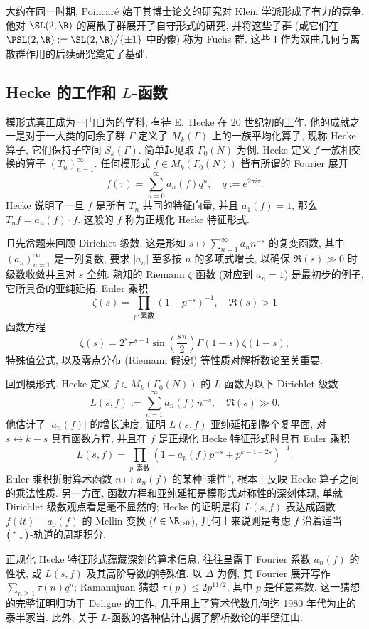 大约在同一时期, Poincaré 始于其博士论文的研究对 Klein 学派形成了有力的竞争. 他对 $\SL(2, \R)$ 的离散子群展开了自守形式的研究, 并将这些子群 (或它们在 $\PSL(2, \R) := \SL(2, \R) \big/ \{\pm 1\}$ 中的像) 称为 Fuchs 群. 这些工作为双曲几何与离散群作用的后续研究奠定了基础.

\subsection*{Hecke 的工作和 $L$-函数}
模形式真正成为一门自为的学科, 有待 E.\ Hecke 在 20 世纪初的工作. 他的成就之一是对于一大类的同余子群 $\Gamma$ 定义了 $M_k(\Gamma)$ 上的一族平均化算子, 现称 Hecke 算子, 它们保持子空间 $S_k(\Gamma)$. 简单起见取 $\Gamma_0(N)$ 为例. Hecke 定义了一族相交换的算子 $(T_n)_{n=1}^\infty$. 任何模形式 $f \in M_k(\Gamma_0(N))$ 皆有所谓的 Fourier 展开
\[ f(\tau) = \sum_{n = 0}^\infty a_n(f) q^n, \quad q := e^{2\pi i\tau}. \]
Hecke 说明了一旦 $f$ 是所有 $T_n$ 共同的特征向量, 并且 $a_1(f) = 1$, 那么 $T_n f = a_n(f) \cdot f$. 这般的 $f$ 称为正规化 Hecke 特征形式.

且先岔题来回顾 Dirichlet 级数. 这是形如 $s \mapsto \sum_{n=1}^\infty a_n n^{-s}$ 的复变函数, 其中 $(a_n)_{n=1}^\infty$ 是一列复数, 要求 $|a_n|$ 至多按 $n$ 的多项式增长, 以确保 $\Re(s) \gg 0$ 时级数收敛并且对 $s$ 全纯. 熟知的 Riemann $\zeta$ 函数 (对应到 $a_n = 1$) 是最初步的例子, 它所具备的亚纯延拓, Euler 乘积
\[ \zeta(s) = \prod_{p: \text{素数}} \left( 1 - p^{-s} \right)^{-1}, \quad \Re(s) > 1 \]
函数方程
\[ \zeta(s) = 2^s \pi^{s-1} \sin\left( \frac{s\pi}{2} \right) \Gamma(1-s) \zeta(1-s), \]
特殊值公式, 以及零点分布 (Riemann 假设!) 等性质对解析数论至关重要.

回到模形式. Hecke 定义 $f \in M_k(\Gamma_0(N))$ 的 $L$-函数为以下 Dirichlet 级数
\[ L(s, f) := \sum_{n=1}^\infty a_n(f) n^{-s}, \quad \Re(s) \gg 0. \]
他估计了 $|a_n(f)|$ 的增长速度, 证明 $L(s, f)$ 亚纯延拓到整个复平面, 对 $s \leftrightarrow k - s$ 具有函数方程, 并且在 $f$ 是正规化 Hecke 特征形式时具有 Euler 乘积
\[ L(s, f) = \prod_{p: \text{素数}} \left( 1 - a_p(f) p^{-s} + p^{k-1-2s} \right)^{-1}. \]
Euler 乘积折射算术函数 $n \mapsto a_n(f)$ 的某种``乘性'', 根本上反映 Hecke 算子之间的乘法性质. 另一方面, 函数方程和亚纯延拓是模形式对称性的深刻体现, 单就 Dirichlet 级数观点看是毫不显然的; Hecke 的证明是将 $L(s, f)$ 表达成函数 $f(it) - a_0(f)$ 的 Mellin 变换 ($t \in \R_{> 0}$), 几何上来说则是考虑 $f$ 沿着适当 $\bigl(\begin{smallmatrix} * &  \\  & * \end{smallmatrix}\bigr)$-轨道的周期积分.

正规化 Hecke 特征形式蕴藏深刻的算术信息, 往往呈露于 Fourier 系数 $a_n(f)$ 的性状, 或 $L(s, f)$ 及其高阶导数的特殊值. 以 $\Delta$ 为例, 其 Fourier 展开写作 $\sum_{n \geq 1} \tau(n) q^n$; Ramanujuan 猜想 $\tau(p) \leq 2p^{11/2}$, 其中 $p$ 是任意素数. 这一猜想的完整证明归功于 Deligne 的工作, 几乎用上了算术代数几何迄 1980 年代为止的泰半家当. 此外, 关于 $L$-函数的各种估计占据了解析数论的半壁江山.

